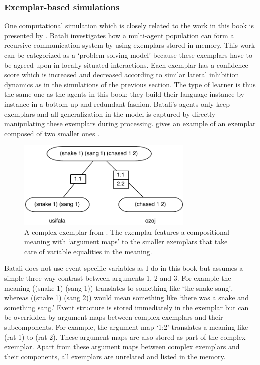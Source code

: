\subsubsection{Exemplar-based simulations}
 One computational simulation which is closely related to the work in this book is presented by \citet{batali02negotiation}. Batali investigates how a multi-agent population can form a recursive communication system by using exemplars stored in memory. This work can be categorized as a `problem-solving model' because these exemplars have to be agreed upon in locally situated interactions. Each exemplar has a confidence score which is increased and decreased according to similar lateral inhibition dynamics as in the simulations of the previous section. The type of learner is thus the same one as the agents in this book: they build their language instance by instance in a bottom-up and redundant fashion. Batali's agents only keep exemplars and all generalization in the model is captured by directly manipulating these exemplars during processing.  gives an example of an exemplar composed of two smaller ones \citep[exemplar 5.1.2.a]{batali02negotiation}.
\begin{figure}[h]
\centerline{\includegraphics[width=0.75\textwidth]{Chapter4/figs/batali}}
  \caption[An exemplar \citep{batali02negotiation}]{A complex exemplar from \citet{batali02negotiation}. The exemplar features a compositional meaning with `argument maps' to the smaller exemplars that take care of variable equalities in the meaning.}
   \label{f:batali}
\end{figure}

Batali does not use event-specific variables as I do in this book but assumes a simple three-way contrast between arguments 1, 2 and 3. For example the meaning ((snake 1) (sang 1)) translates to something like `the snake sang', whereas ((snake 1) (sang 2)) would mean something like `there was a snake and something sang.' Event structure is stored immediately in the exemplar but can be overridden by argument maps between complex exemplars and their subcomponents. For example, the argument map `1:2' translates a meaning like (rat 1) to (rat 2). These argument maps are also stored as part of the complex exemplar. Apart from these argument maps between complex exemplars and their components, all exemplars are unrelated and listed in the memory.

